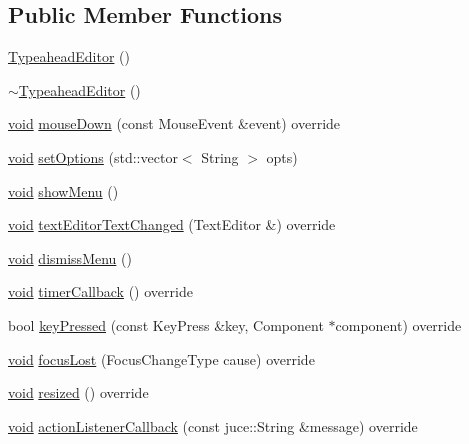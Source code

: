 \subsection*{Public Member Functions}
\begin{DoxyCompactItemize}
\item 
\hyperlink{class_typeahead_editor_ad8c967c6f8afd68f04c0fda4a7631704}{Typeahead\+Editor} ()
\item 
\hyperlink{class_typeahead_editor_a2c4ccf6fc7191665150f36c88df1fa67}{$\sim$\+Typeahead\+Editor} ()
\item 
\hyperlink{tk_8h_aba408b7cd755a96426e004c015f5de8e}{void} \hyperlink{class_typeahead_editor_a4942e3438d0aa957b7ec729710c70a50}{mouse\+Down} (const Mouse\+Event \&event) override
\item 
\hyperlink{tk_8h_aba408b7cd755a96426e004c015f5de8e}{void} \hyperlink{class_typeahead_editor_a45f73a99da1b4ff012c604765f80e8d0}{set\+Options} (std\+::vector$<$ String $>$ opts)
\item 
\hyperlink{tk_8h_aba408b7cd755a96426e004c015f5de8e}{void} \hyperlink{class_typeahead_editor_a24bfe0b145f960d2765885c62905f7e0}{show\+Menu} ()
\item 
\hyperlink{tk_8h_aba408b7cd755a96426e004c015f5de8e}{void} \hyperlink{class_typeahead_editor_a9e91eee02228481e5651189dbc486d00}{text\+Editor\+Text\+Changed} (Text\+Editor \&) override
\item 
\hyperlink{tk_8h_aba408b7cd755a96426e004c015f5de8e}{void} \hyperlink{class_typeahead_editor_ae1c47bed0eac90df9affad67cd9f755c}{dismiss\+Menu} ()
\item 
\hyperlink{tk_8h_aba408b7cd755a96426e004c015f5de8e}{void} \hyperlink{class_typeahead_editor_ad2d40cb37ad5ef0dd3e9c54384c403d1}{timer\+Callback} () override
\item 
bool \hyperlink{class_typeahead_editor_a3622d6740193b88c7ee5c0a7b2335958}{key\+Pressed} (const Key\+Press \&key, Component $\ast$component) override
\item 
\hyperlink{tk_8h_aba408b7cd755a96426e004c015f5de8e}{void} \hyperlink{class_typeahead_editor_abe5dec053fa695c133250a317a046822}{focus\+Lost} (Focus\+Change\+Type cause) override
\item 
\hyperlink{tk_8h_aba408b7cd755a96426e004c015f5de8e}{void} \hyperlink{class_typeahead_editor_a168babdbdaaa02abdae5172f98ef09db}{resized} () override
\item 
\hyperlink{tk_8h_aba408b7cd755a96426e004c015f5de8e}{void} \hyperlink{class_typeahead_editor_aca498173bb04dfd712f14c5bad4d3b02}{action\+Listener\+Callback} (const juce\+::\+String \&message) override

\end{DoxyCompactItemize}
